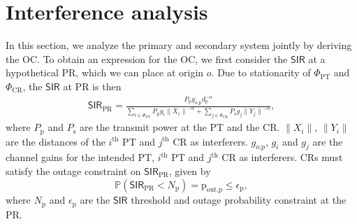 \documentclass[conference, twocolumn]{IEEEtran}
\newcommand{\sub}[1]{_{\text{#1}}}
\begin{document}
\section{Interference analysis} \label{sec:int ana}
In this section, we analyze the primary and secondary system jointly by deriving the OC. 
To obtain an expression for the OC, we first consider the $\textsf{SIR}$ at a hypothetical PR, which we can place at origin $o$. Due to stationarity of $\Phi\sub{PT}$ and $\Phi\sub{CR}$, the $\mathsf{SIR}$ at PR is then
\begin{align}
\textsf{SIR}\sub{PR} = \frac{P\sub{p} g\sub{$o$,p} d\sub{p}^{-\alpha}}{\sum\limits_{i \in \Phi_{\text{PT}}} P\sub{p} g_i {\|X_i\|}^{-\alpha} +  \sum\limits_{j \in \Phi_{\text{CR}}} P\sub{s} g_j {\|Y_j\|}^{-\alpha}},  
\label{eq:SIR_PR}  
\end{align}
where $P\sub{p}$ and $P\sub{s}$ are the transmit power at the PT and the CR. $\|X_i\|$, $\|Y_i\|$ are the distances of the $i^{\text{th}}$ PT and $j^{\text{th}}$ CR as interferers. $g\sub{$o$,p}$, $g_i$ and $g_j$ are the channel gains for the intended PT, $i^{\text{th}}$ PT and $j^{\text{th}}$ CR as interferers. CRs must satisfy the outage constraint on $\mathsf{SIR}\sub{PR}$, given by  
\begin{equation}
\mathbb{P}(\textsf{SIR}\sub{PR} < N\sub{p}) = \text{p}\sub{out,p} \leq \epsilon\sub{p}, 
\label{eq:SIR_I}
\end{equation}
where $N\sub{p}$ and $\epsilon\sub{p}$ are the $\textsf{SIR}$ threshold and outage probability constraint at the PR. %
\end{document}
